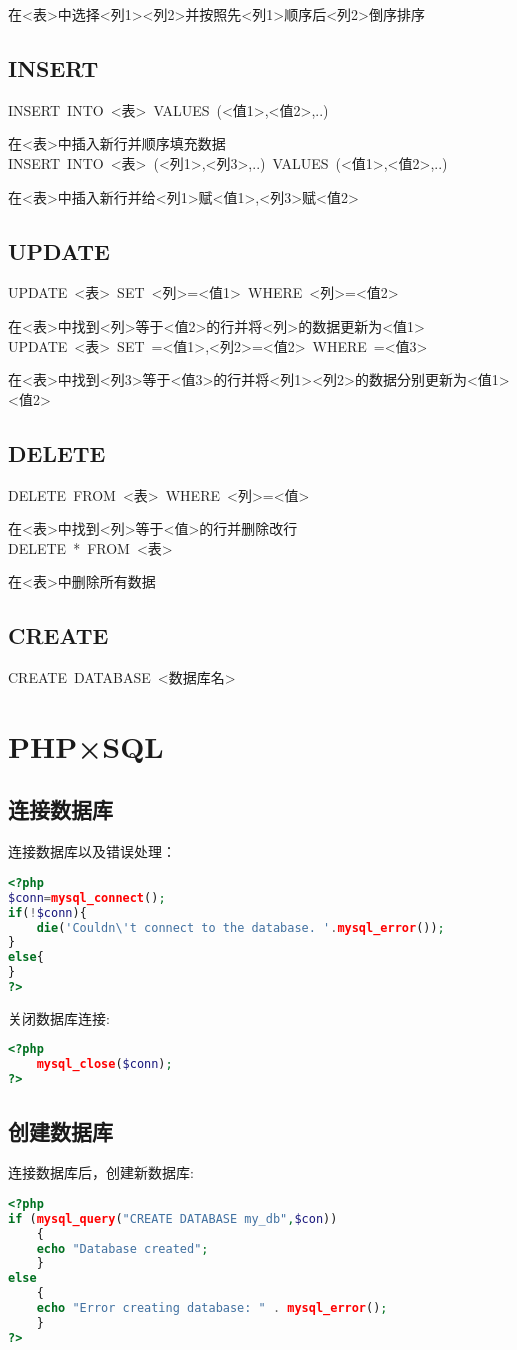 \documentclass[UTF8]{ctexart}
\begin{document}
在<表>中选择<列1><列2>并按照先<列1>顺序后<列2>倒序排序
\subsection{INSERT}
\noindent
INSERT\ INTO\ <表>\ VALUES\ (<值1>,<值2>,..)

在<表>中插入新行并顺序填充数据
\\
INSERT\ INTO\ <表>\ (<列1>,<列3>,..)\ VALUES\ (<值1>,<值2>,..)

在<表>中插入新行并给<列1>赋<值1>,<列3>赋<值2>
\subsection{UPDATE}
\noindent
UPDATE\ <表>\ SET\ <列>=<值1>\ WHERE\ <列>=<值2>

在<表>中找到<列>等于<值2>的行并将<列>的数据更新为<值1>
\\
UPDATE\ <表>\ SET\ <列1>=<值1>,<列2>=<值2>\ WHERE\ <列3>=<值3>

在<表>中找到<列3>等于<值3>的行并将<列1><列2>的数据分别更新为<值1><值2>
\subsection{DELETE}
\noindent
DELETE\ FROM\ <表>\ WHERE\ <列>=<值>

在<表>中找到<列>等于<值>的行并删除改行
\\
DELETE\ *\ FROM\ <表>

在<表>中删除所有数据

\subsection{CREATE}
\noindent
CREATE\ DATABASE\ <数据库名>
\section{PHP×SQL}
\subsection{连接数据库}
\noindent
连接数据库以及错误处理：
\begin{lstlisting}[language=PHP]
<?php
$conn=mysql_connect();
if(!$conn){
    die('Couldn\'t connect to the database. '.mysql_error());
}
else{
}
?>
\end{lstlisting}
关闭数据库连接:
\begin{lstlisting}[language=PHP]
<?php
    mysql_close($conn);
?>
\end{lstlisting}

\subsection{创建数据库}
连接数据库后，创建新数据库:
\begin{lstlisting}[language=PHP]
<?php
if (mysql_query("CREATE DATABASE my_db",$con))
    {
    echo "Database created";
    }
else
    {
    echo "Error creating database: " . mysql_error();
    }
?>
\end{lstlisting}
\end{document}
